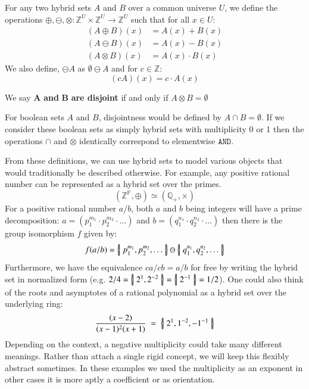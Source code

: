 \begin{definition}
	For any two hybrid sets $A$ and $B$ over a common universe $U$, 
	we define the operations $\oplus, \ominus, \otimes : \mathbb{Z}^U \times \mathbb{Z}^U \to \mathbb{Z}^U$ 
	such that for all $x \in U$:
	\begin{align}
		(A \oplus B)(x) 	&= A(x) + B(x) \\
		(A \ominus B)(x) 	&= A(x) - B(x) \\
		(A \otimes B)(x) 	&= A(x) \cdot B(x)
	\end{align}
	We also define, $\ominus A$ as $\emptyset \ominus A$ and for $c \in \mathbb{Z}$:
	\begin{equation}
		(cA)(x) = c \cdot A(x)
	\end{equation}
\end{definition}


\begin{definition}
	We say $\boldsymbol{A}$ \textbf{and} $\boldsymbol{B}$ \textbf{are disjoint} if and only if $A \otimes B = \emptyset$
\end{definition}
For boolean sets $A$ and $B$, disjointness would be defined by $A \cap B = \emptyset$.
If we consider these boolean sets as simply hybrid sets with multiplicity 0 or 1 then the operations $\cap$ and $\otimes$
identically correspond to elementwise $\texttt{AND}$.


From these definitions, we can use hybrid sets to model various objects that would traditionally be described otherwise. 
For example, any positive rational number can be represented as a hybrid set over the primes.
\begin{equation*}
	(\mathbb{Z}^\mathbb{P}, \oplus) \simeq (\mathbb{Q}_+,\times)
\end{equation*}
For a positive rational number $a/b$, both $a$ and $b$ being integers will have a prime decomposition: 
$a=(p_1^{m_1}\cdot p_2^{m_2} \cdot \ldots)$ and $b=(q_1^{n_1} \cdot q_2^{n_2} \cdot \ldots)$
then there is the group isomorphism $f$ given by:
\begin{equation*}
	f(a/b) = \left\{ \! \left| \; p_1^{m_1}, p_2^{m_2}, \ldots \; \right| \! \right\} \ominus \left\{ \! \left| \; q_1^{n_1}, q_2^{n_2}, \ldots \; \right| \! \right\}
\end{equation*}
Furthermore, we have the equivalence $ca/cb = a/b$ for free by writing the hybrid set in normalized form
(e.g. $2/4 = \left\{ \! \left| \; 2^1, 2^{-2} \; \right| \! \right\} = \left\{ \! \left| \; 2^{-1} \; \right| \! \right\} = 1/2$).
One could also think of the roots and asymptotes of a rational polynomial as a hybrid set over the underlying ring:
\begin{equation*}
	\frac{(x-2)}{(x-1)^2(x+1)} \;=\; \left\{ \! \left| \;  2^1, 1^{-2}, -1^{-1}  \; \right| \! \right\}
\end{equation*}
Depending on the context, a negative multiplicity could take many different meanings.
Rather than attach a single rigid concept, we will keep this flexibly abstract sometimes.
In these examples we used the multiplicity as an exponent in other cases it is more aptly a coefficient  or as orientation.


